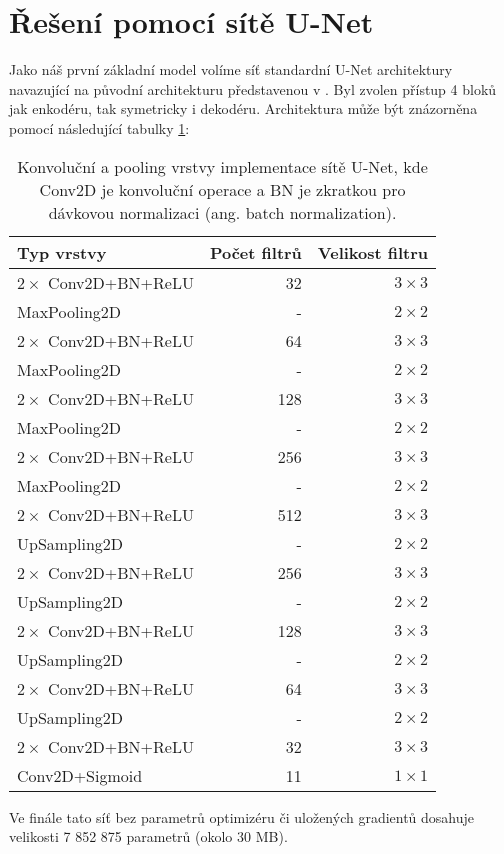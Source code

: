 \section{Řešení pomocí sítě U-Net}
\label{sec:Chapter43}
Jako náš první základní model volíme síť standardní U-Net architektury navazující na původní architekturu představenou v \cite{unet}. Byl zvolen přístup 4 bloků jak enkodéru, tak symetricky i dekodéru. Architektura může být znázorněna pomocí následující tabulky \ref{fig:model_architecture}:

\begin{table}[ht]
\centering
\begin{tabular}{@{}lrr@{}}
\toprule
Typ vrstvy & Počet filtrů & Velikost filtru \\ \midrule
$2\times$ Conv2D+BN+ReLU & 32 & $3 \times 3$ \\
MaxPooling2D & - & $2 \times 2$ \\
$2\times$ Conv2D+BN+ReLU & 64 & $3 \times 3$ \\
MaxPooling2D & - & $2 \times 2$ \\
$2\times$ Conv2D+BN+ReLU & 128 & $3 \times 3$ \\
MaxPooling2D & - & $2 \times 2$ \\
$2\times$ Conv2D+BN+ReLU & 256 & $3 \times 3$ \\
MaxPooling2D & - & $2 \times 2$ \\
$2\times$ Conv2D+BN+ReLU & 512 & $3 \times 3$ \\
UpSampling2D & - & $2 \times 2$ \\
$2\times$ Conv2D+BN+ReLU & 256 & $3 \times 3$ \\
UpSampling2D & - & $2 \times 2$ \\
$2\times$ Conv2D+BN+ReLU & 128 & $3 \times 3$ \\
UpSampling2D & - & $2 \times 2$ \\
$2\times$ Conv2D+BN+ReLU & 64 & $3 \times 3$ \\
UpSampling2D & - & $2 \times 2$ \\
$2\times$ Conv2D+BN+ReLU & 32 & $3 \times 3$ \\
Conv2D+Sigmoid & 11 & $1 \times 1$ \\
\bottomrule
\end{tabular}
\caption[Konvoluční a pooling vrstvy implementace sítě U-Net]{Konvoluční a pooling vrstvy implementace sítě U-Net, kde Conv2D je konvoluční operace a BN je zkratkou pro dávkovou normalizaci (ang. batch normalization). }
\label{fig:model_architecture}
\end{table}

Ve finále tato síť bez parametrů optimizéru či uložených gradientů dosahuje velikosti 7 852 875 parametrů (okolo 30 MB).


\endinput